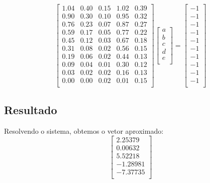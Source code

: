 \documentclass[12pt,a4paper]{article}
\begin{document}
\[
\left[
\begin{array}{ccccc}
    1.04 & 0.40 & 0.15 & 1.02 & 0.39 \\
    0.90 & 0.30 & 0.10 & 0.95 & 0.32 \\
    0.76 & 0.23 & 0.07 & 0.87 & 0.27 \\
    0.59 & 0.17 & 0.05 & 0.77 & 0.22 \\
    0.45 & 0.12 & 0.03 & 0.67 & 0.18 \\
    0.31 & 0.08 & 0.02 & 0.56 & 0.15 \\
    0.19 & 0.06 & 0.02 & 0.44 & 0.13 \\
    0.09 & 0.04 & 0.01 & 0.30 & 0.12 \\
    0.03 & 0.02 & 0.02 & 0.16 & 0.13 \\
    0.00 & 0.00 & 0.02 & 0.01 & 0.15 \\
\end{array}
\right]
\left[
\begin{array}{c}
    a \\
    b \\
    c \\
    d \\
    e \\
\end{array}
\right]
=
\left[
\begin{array}{c}
    -1 \\
    -1 \\
    -1 \\
    -1 \\
    -1 \\
    -1 \\
    -1 \\
    -1 \\
    -1 \\
    -1 \\
\end{array}
\right]
\]

\subsection{Resultado}
Resolvendo o sistema, obtemos o vetor aproximado:
\[
\left[
\begin{array}{c}
    2.25379 \\
    0.00632 \\
    5.52218 \\
    -1.28981 \\
    -7.37735 \\
\end{array}
\right]
\]
\end{document}
